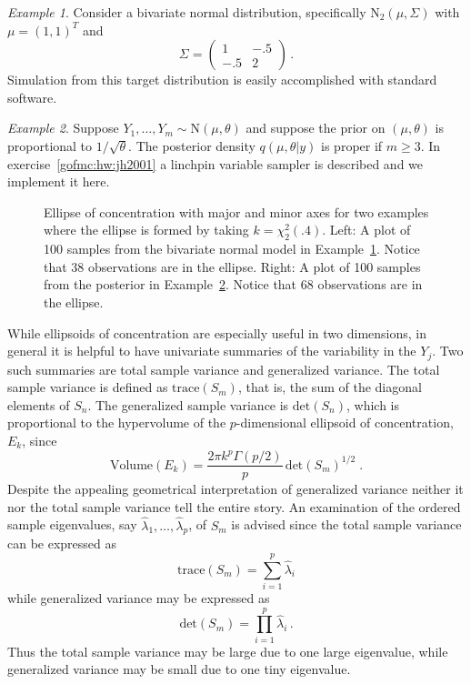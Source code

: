 \documentclass[12pt]{article}
\theoremstyle{plain}
\theoremstyle{definition}
\theoremstyle{remark}
\newtheorem{example}{Example}[section]
\begin{document}
\begin{example} \label{gofmc:ex:bnorm}
Consider a bivariate normal distribution, specifically $\text{N}_2 (\mu, \Sigma)$ with $\mu=(1,1)^T$ and 
$$
\Sigma = 
\begin{pmatrix}
1 & -.5 \\
-.5 & 2
\end{pmatrix} \, .
$$
Simulation from this target distribution is easily accomplished with
standard software.
\end{example}

\begin{example} \label{gofmc:ex:jh2001}
Suppose $Y_{1},\ldots,Y_{m} \sim \text{N}(\mu, \theta)$ and suppose
the prior on $(\mu, \theta)$ is proportional to $1/\sqrt{\theta}$. The
posterior density $q(\mu, \theta | y) $ is proper if $m \ge 3$.  In
exercise~\ref{gofmc:hw:jh2001} a linchpin variable sampler is
described and we implement it here. 
\end{example}

\begin{figure}
\centering
{}
\caption{Ellipse of concentration with major and minor axes for two
  examples where the ellipse is formed  by taking
  $k=\chi^2_2(.4)$. Left: A plot of 100 samples from the bivariate
  normal model in Example~\ref{gofmc:ex:bnorm}. Notice that 38
  observations are in the ellipse.  Right: A plot of 100 samples from
  the posterior in Example~\ref{gofmc:ex:jh2001}.   Notice that 68
  observations are in the ellipse.} 
\label{gofmc:fig:bnorm_and_jh2001_combined}
\end{figure}

While ellipsoids of concentration are especially useful in two
dimensions, in general it is helpful to have univariate summaries of
the variability in the $Y_j$.  Two such summaries are total sample
variance and generalized variance. The total sample variance is
defined as $\text{trace}(S_m)$, that is, the sum of the diagonal
elements of $S_n$.  The generalized sample variance is
$\text{det}(S_n)$, which is proportional to the hypervolume of the
$p$-dimensional ellipsoid of concentration, $E_k$, since 
$$
\text{Volume}(E_k) = \frac{2\pi k^p \Gamma(p/2)}{p}\, \text{det}(S_m)^{1/2} \; . 
$$
Despite the appealing geometrical interpretation  of generalized
variance neither it nor the total sample variance tell the entire
story.  An examination of the ordered sample eigenvalues, say
$\hat{\lambda}_1, \ldots, \hat{\lambda}_p$, of $S_m$ is advised since
the total sample variance can be expressed as 
$$
\text{trace}(S_m) = \sum_{i=1}^{p} \hat{\lambda}_i
$$
while generalized variance may be expressed as
$$
\text{det}(S_m) = \prod_{i=1}^{p} \hat{\lambda}_i \, .
$$
Thus the total sample variance may be large due to one large
eigenvalue, while generalized variance may be small due to one tiny
eigenvalue.
\end{document}
